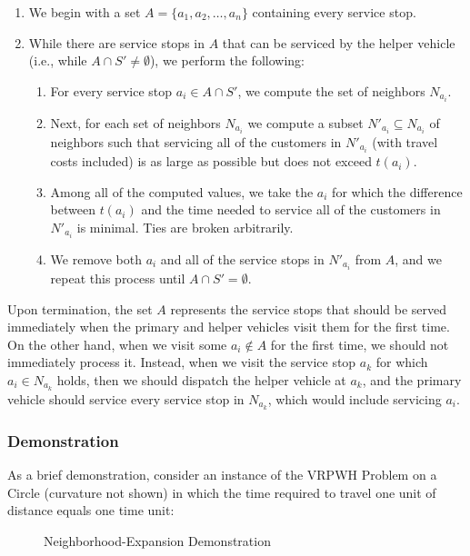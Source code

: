 \documentclass[12pt]{scrartcl}
\begin{document}
\begin{enumerate}
    \item We begin with a set $A = \{a_1, a_2, \ldots, a_n\}$ containing every service stop.
    \item While there are service stops in $A$ that can be serviced by the helper vehicle (i.e., while $A \cap S' \neq \emptyset$), we perform the following:
    \begin{enumerate}
        \item For every service stop $a_i \in A \cap S'$, we compute the set of neighbors $N_{a_{i}}$. 
        \item Next, for each set of neighbors $N_{a_i}$ we compute a subset $N'_{a_i} \subseteq N_{a_i}$ of neighbors such that servicing all of the customers in $N'_{a_i}$ (with travel costs included) is as large as possible but does not exceed $t(a_i)$.  
        \item Among all of the computed values, we take the $a_i$ for which the difference between $t(a_i)$ and the time needed to service all of the customers in $N'_{a_i}$ is minimal. Ties are broken arbitrarily. 
        \item We remove both $a_i$ and all of the service stops in $N'_{a_i}$ from $A$, and we repeat this process until $A \cap S' = \emptyset.$ 
    \end{enumerate}
\end{enumerate}

\noindent Upon termination, the set $A$ represents the service stops that should be served immediately when the primary and helper vehicles visit them for the first time. On the other hand, when we visit some $a_i \not \in A$ for the first time, we should not immediately process it. Instead, when we visit the service stop $a_k$ for which $a_i \in N_{a_k}$ holds, then we should dispatch the helper vehicle at $a_k$, and the primary vehicle should service every service stop in $N_{a_k}$, which would include servicing $a_i$.  \\

\subsubsection{Demonstration}
As a brief demonstration, consider an instance of the VRPWH Problem on a Circle (curvature not shown) in which the time required to travel one unit of distance equals one time unit:

\begin{figure}[H]
  \centering
  \caption{Neighborhood-Expansion Demonstration}
\end{figure}
\end{document}
